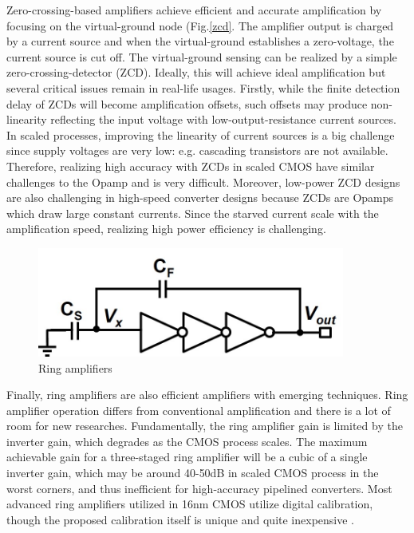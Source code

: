 Zero-crossing-based amplifiers \cite{fiorenza2006comparator}\cite{zerocrossing}\cite{chang201411}\cite{brooks200912b} achieve efficient and accurate amplification by focusing on the virtual-ground node (Fig.\ref{zcd}. The amplifier output is charged by a current source and when the virtual-ground establishes a zero-voltage, the current source is cut off. The virtual-ground sensing can be realized by a simple zero-crossing-detector (ZCD). Ideally, this will achieve ideal amplification but several critical issues remain in real-life usages. Firstly, while the finite detection delay of ZCDs will become amplification offsets, such offsets may produce non-linearity reflecting the input voltage with low-output-resistance current sources. In scaled processes, improving the linearity of current sources is a big challenge since supply voltages are very low: e.g. cascading transistors are not available. 
Therefore, realizing high accuracy with ZCDs in scaled CMOS have similar challenges to the Opamp and is very difficult. Moreover, low-power ZCD designs are also challenging in high-speed converter designs because ZCDs are Opamps which draw large constant currents. Since the starved current scale with the amplification speed, realizing high power efficiency is challenging.

\begin{figure}[!]
\centering
  \includegraphics[width=0.9\textwidth]{figure/chap2/ring.jpg}
  \caption{Ring amplifiers}
  \label{ring}
\end{figure}

Finally, ring amplifiers \cite{hershberg2012ring}\cite{lim20151}\cite{hershberg2012phd} are also efficient amplifiers with emerging techniques. Ring amplifier operation differs from conventional amplification and there is a lot of room for new researches. 
Fundamentally, the ring amplifier gain is limited by the inverter gain, which degrades as the CMOS process scales.
The maximum achievable gain for a three-staged ring amplifier will be a cubic of a single inverter gain, which may be around 40-50dB in scaled CMOS process in the worst corners, and thus inefficient for high-accuracy pipelined converters. Most advanced ring amplifiers utilized in 16nm CMOS utilize digital calibration, though the proposed calibration itself is unique and quite inexpensive \cite{hershberg-ring-16nm} \cite{hershberg-ring-16nm2}.

